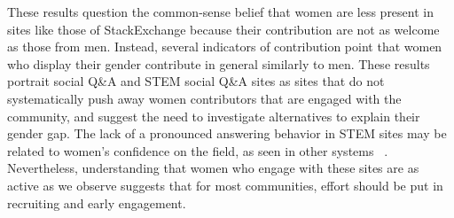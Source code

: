 These results question the common-sense belief that women are less present in sites like those of StackExchange because their contribution are not as welcome as those from men. Instead, several indicators of contribution point that women who display their gender contribute in general similarly to men. These results portrait social Q\&A  and STEM social Q\&A sites as sites that do not systematically push away women contributors that are engaged with the community, and suggest the need to investigate alternatives to explain their gender gap. The lack of a pronounced answering behavior in STEM sites may be related to women's confidence on the field, as seen in other systems ~\cite{piazza:report}. Nevertheless, understanding that women who engage with these sites are as active as we observe suggests that for most communities, effort should be put in recruiting and early engagement. 


